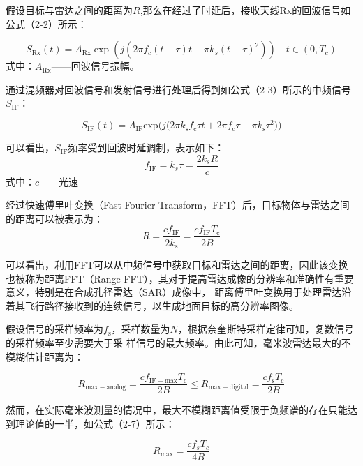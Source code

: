 假设目标与雷达之间的距离为$R$,那么在经过了时延后，接收天线Rx的回波信号如公式（2-2）所示：

\begin{equation}
    S_{\mathrm{Rx}}\left(t\right)=A_{\mathrm{Rx}}\exp\left(j\left(2\pi f_{c}\left(t-\tau\right)t+\pi k_{s}\left(t-\tau\right)^{2}\right)\right)\quad t\in\left(0,T_{c}\right)
\end{equation}
式中：$A_\mathrm{Rx}$——回波信号振幅。

通过混频器对回波信号和发射信号进行处理后得到如公式（2-3）所示的中频信号$S_{\mathrm{IF}}$：

\begin{equation}
    S_{\mathrm{IF}}\left(t\right)=A_{\mathrm{IF}}\mathrm{exp}\Big(j\Big(2\pi k_{\mathrm{s}}f_{\mathrm{c}}\tau t+2\pi f_{\mathrm{c}}\tau-\pi k_{\mathrm{s}}\tau^{2}\Big)\Big)
\end{equation}

可以看出，$S_{\mathrm{IF}}$频率受到回波时延调制，表示如下：
\begin{equation}
    f_{\mathrm{IF}}=k_{s}\tau=\frac{2k_{s}R}{c}
\end{equation}
式中：$c$——光速

经过快速傅里叶变换（Fast Fourier Transform，FFT）后，目标物体与雷达之间的距离可以被表示为：
\begin{equation}
    R=\frac{cf_{\mathrm{IF}}}{2k_{\mathrm{s}}}=\frac{cf_{\mathrm{IF}}T_{\mathrm{c}}}{2B}
\end{equation}

可以看出，利用FFT可以从中频信号中获取目标和雷达之间的距离，因此该变换也被称为距离FFT（Range-FFT），其对于提高雷达成像的分辨率和准确性有重要意义，特别是在合成孔径雷达（SAR）成像中，
距离傅里叶变换用于处理雷达沿着其飞行路径接收到的连续信号，以生成地面目标的高分辨率图像。

假设信号的采样频率为$f_{\mathrm{s}}$，采样数量为$N$，根据奈奎斯特采样定律可知，复数信号的采样频率至少需要大于采
样信号的最大频率。由此可知，毫米波雷达最大的不模糊估计距离为：

\begin{equation}
    R_{\mathrm{max-analog}}=\frac{cf_{\mathrm{IF-max}}T_{\mathrm{c}}}{2B}\leq R_{\mathrm{max-digital}}=\frac{cf_{\mathrm{s}}T_{\mathrm{c}}}{2B}
\end{equation}

然而，在实际毫米波测量的情况中，最大不模糊距离值受限于负频谱的存在只能达到理论值的一半，如公式（2-7）所示：

\begin{equation}
    R_{\max}=\frac{cf_{s}T_{c}}{4B}
\end{equation}

